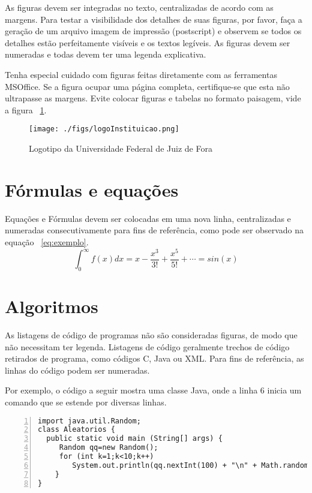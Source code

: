 \documentclass[a4paper,12pt]{monografia}
\theoremstyle{plain}
\theoremstyle{definition}
\theoremstyle{remark}
\begin{document}
As figuras devem ser integradas no texto, centralizadas de acordo com as margens. Para testar a visibilidade dos detalhes de suas figuras, por favor, faça a geração de um arquivo imagem de impressão (postscript) e observem se todos os detalhes estão perfeitamente visíveis e os textos legíveis.  As figuras devem ser numeradas e todas devem ter uma legenda explicativa. 

Tenha especial cuidado com figuras feitas diretamente com as ferramentas MSOffice. Se a figura ocupar uma página completa, certifique-se que esta não ultrapasse as margens. Evite colocar figuras e tabelas no formato paisagem, vide a figura ~\ref{fig:logoufjf}.

\begin{figure}[ht]
 \begin{center}
   \texttt{[image: ./figs/logoInstituicao.png]} %
  \caption{Logotipo da Universidade Federal de Juiz de Fora}
  \label{fig:logoufjf}
 \end{center}
\end{figure}

\section{Fórmulas e equações}
Equações e Fórmulas devem ser colocadas em uma nova linha, centralizadas e numeradas consecutivamente para fins de referência, como pode ser observado na equação ~\ref{eq:exemplo}.
\begin{equation}
\int_{0}^{\infty}f(x)dx = x - \frac{x^3}{3!} + \frac{x^5}{5!} + \cdots = sin(x)
\label{eq:exemplo}
\end{equation}

\section{Algoritmos} 
As listagens de código de programas não são consideradas figuras, de modo que não necessitam ter legenda. Listagens de código geralmente trechos de código retirados de programa, como códigos C, Java ou XML. Para fins de referência, as linhas do código podem ser numeradas.

Por exemplo, o código a seguir mostra uma classe Java, onde a linha 6 inicia um comando que se estende por diversas linhas. 


\lstset{tabsize=5,language=C,showstringspaces=false,basicstyle=\ttfamily\small,keywordstyle=\bf,breaklines=true}
\begin{singlespacing}
\begin{lstlisting}[frame=single,framexrightmargin=1pt,numbers=left]
import java.util.Random;
class Aleatorios {
  public static void main (String[] args) {
     Random qq=new Random();
     for (int k=1;k<10;k++)
        System.out.println(qq.nextInt(100) + "\n" + Math.random());
    }
}
\end{lstlisting}
\end{singlespacing}
\end{document}

